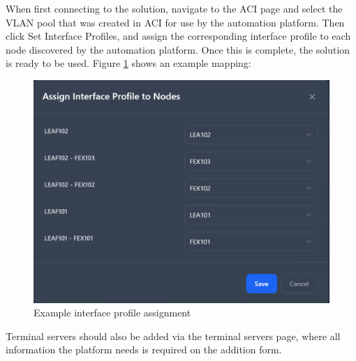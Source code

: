 When first connecting to the solution, navigate to the ACI page and select the VLAN pool that was created in ACI for use by the automation platform. Then click Set Interface Profiles, and assign the corresponding interface profile to each node discovered by the automation platform. Once this is complete, the solution is ready to be used. Figure \ref{d:interface-assignment} shows an example mapping:

\begin{figure}[H]
    \centering
    \includegraphics[width=0.6\linewidth]{images/interfaceprof-mapping.png}
    \caption{Example interface profile assignment}
    \label{d:interface-assignment}
\end{figure}

Terminal servers should also be added via the terminal servers page, where all information the platform needs is required on the addition form.